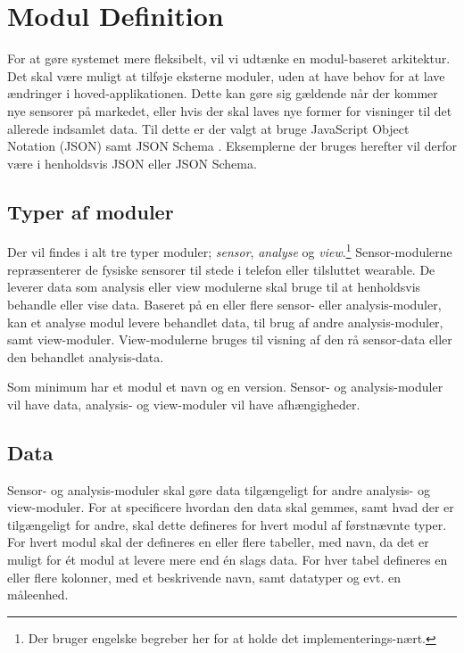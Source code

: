 \section{Modul Definition}


For at gøre systemet mere fleksibelt, vil vi udtænke en modul-baseret arkitektur.
Det skal være muligt at tilføje eksterne moduler, uden at have behov for at lave ændringer i hoved-applikationen.
Dette kan gøre sig gældende når der kommer nye sensorer på markedet, eller hvis der skal laves nye former for visninger til det allerede indsamlet data.
Til dette er der valgt at bruge JavaScript Object Notation (JSON) samt JSON Schema \cite{json_schema}.
Eksemplerne der bruges herefter vil derfor være i henholdsvis JSON eller JSON Schema.

\subsection{Typer af moduler}
Der vil findes i alt tre typer moduler; \textit{sensor}, \textit{analyse} og \textit{view}.\footnote{Der bruger engelske begreber her for at holde det implementerings-nært.}
Sensor-modulerne repræsenterer de fysiske sensorer til stede i telefon eller tilsluttet wearable.
De leverer data som analysis eller view modulerne skal bruge til at henholdsvis behandle eller vise data.
Baseret på en eller flere sensor- eller analysis-moduler, kan et analyse modul levere behandlet data, til brug af andre analysis-moduler, samt view-moduler.
View-modulerne bruges til visning af den rå sensor-data eller den behandlet analysis-data.

Som minimum har et modul et navn og en version.
Sensor- og analysis-moduler vil have data, analysis- og view-moduler vil have afhængigheder.

\subsection{Data}
Sensor- og analysis-moduler skal gøre data tilgængeligt for andre analysis- og view-moduler.
For at specificere hvordan den data skal gemmes, samt hvad der er tilgængeligt for andre, skal dette defineres for hvert modul af førstnævnte typer.
For hvert modul skal der defineres en eller flere tabeller, med navn, da det er muligt for ét modul at levere mere end én slags data.
For hver tabel defineres en eller flere kolonner, med et beskrivende navn, samt datatyper og evt. en måleenhed.


